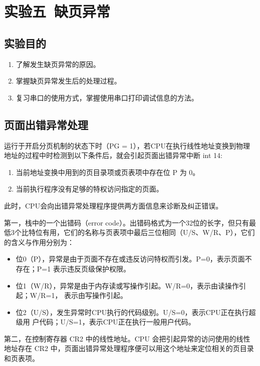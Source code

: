 \section{实验五\ 缺页异常}

\subsection{实验目的}

\begin{enumerate}
    \item 了解发生缺页异常的原因。
    \item 掌握缺页异常发生后的处理过程。
    \item 复习串口的使用方式，掌握使用串口打印调试信息的方法。
\end{enumerate}

\subsection{页面出错异常处理}

运行于开启分页机制的状态下时（PG = 1），若CPU在执行线性地址变换到物理地址的过程中时检测到以下条件后，就会引起页面出错异常中断 int 14:

\begin{enumerate}
    \item 当前地址变换中用到的页目录项或页表项中存在位 P 为 0。
    \item 当前执行程序没有足够的特权访问指定的页面。
\end{enumerate}

此时，CPU会向出错异常处理程序提供两方面信息来诊断及纠正错误。

第一，栈中的一个出错码（error code）。出错码格式为一个32位的长字，但只有最低3个比特位有用，它们的名称与页表项中最后三位相同（U/S、W/R、P），它们的含义与作用分别为：

\begin{itemize}
    \item 位0（P），异常是由于页面不存在或违反访问特权而引发。P=0，表示页面不存在；P=1 表示违反页级保护权限。
    \item 位1（W/R），异常是由于内存读或写操作引起。W/R=0，表示由读操作引起；W/R=1， 表示由写操作引起。
    \item 位2（U/S），发生异常时CPU执行的代码级别。U/S=0，表示CPU正在执行超级用 户代码；U/S=1，表示CPU正在执行一般用户代码。
\end{itemize}

第二，在控制寄存器 CR2 中的线性地址。CPU 会把引起异常的访问使用的线性地址存在 CR2 中，页面出错异常处理程序便可以用这个地址来定位相关的页目录和页表项。

